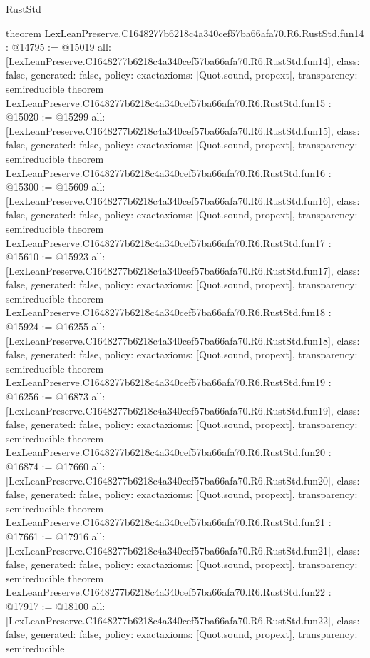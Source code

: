 \begin{lexlean}{RustStd}
\begin{coremodule}
{}
theorem LexLeanPreserve.C1648277b6218c4a340cef57ba66afa70.R6.RustStd.fun14 : @14795 := @15019 {
  all: [LexLeanPreserve.C1648277b6218c4a340cef57ba66afa70.R6.RustStd.fun14],
  class: false,
  generated: false,
  policy: exact{axioms: [Quot.sound, propext]},
  transparency: semireducible
}
theorem LexLeanPreserve.C1648277b6218c4a340cef57ba66afa70.R6.RustStd.fun15 : @15020 := @15299 {
  all: [LexLeanPreserve.C1648277b6218c4a340cef57ba66afa70.R6.RustStd.fun15],
  class: false,
  generated: false,
  policy: exact{axioms: [Quot.sound, propext]},
  transparency: semireducible
}
theorem LexLeanPreserve.C1648277b6218c4a340cef57ba66afa70.R6.RustStd.fun16 : @15300 := @15609 {
  all: [LexLeanPreserve.C1648277b6218c4a340cef57ba66afa70.R6.RustStd.fun16],
  class: false,
  generated: false,
  policy: exact{axioms: [Quot.sound, propext]},
  transparency: semireducible
}
theorem LexLeanPreserve.C1648277b6218c4a340cef57ba66afa70.R6.RustStd.fun17 : @15610 := @15923 {
  all: [LexLeanPreserve.C1648277b6218c4a340cef57ba66afa70.R6.RustStd.fun17],
  class: false,
  generated: false,
  policy: exact{axioms: [Quot.sound, propext]},
  transparency: semireducible
}
theorem LexLeanPreserve.C1648277b6218c4a340cef57ba66afa70.R6.RustStd.fun18 : @15924 := @16255 {
  all: [LexLeanPreserve.C1648277b6218c4a340cef57ba66afa70.R6.RustStd.fun18],
  class: false,
  generated: false,
  policy: exact{axioms: [Quot.sound, propext]},
  transparency: semireducible
}
theorem LexLeanPreserve.C1648277b6218c4a340cef57ba66afa70.R6.RustStd.fun19 : @16256 := @16873 {
  all: [LexLeanPreserve.C1648277b6218c4a340cef57ba66afa70.R6.RustStd.fun19],
  class: false,
  generated: false,
  policy: exact{axioms: [Quot.sound, propext]},
  transparency: semireducible
}
theorem LexLeanPreserve.C1648277b6218c4a340cef57ba66afa70.R6.RustStd.fun20 : @16874 := @17660 {
  all: [LexLeanPreserve.C1648277b6218c4a340cef57ba66afa70.R6.RustStd.fun20],
  class: false,
  generated: false,
  policy: exact{axioms: [Quot.sound, propext]},
  transparency: semireducible
}
theorem LexLeanPreserve.C1648277b6218c4a340cef57ba66afa70.R6.RustStd.fun21 : @17661 := @17916 {
  all: [LexLeanPreserve.C1648277b6218c4a340cef57ba66afa70.R6.RustStd.fun21],
  class: false,
  generated: false,
  policy: exact{axioms: [Quot.sound, propext]},
  transparency: semireducible
}
theorem LexLeanPreserve.C1648277b6218c4a340cef57ba66afa70.R6.RustStd.fun22 : @17917 := @18100 {
  all: [LexLeanPreserve.C1648277b6218c4a340cef57ba66afa70.R6.RustStd.fun22],
  class: false,
  generated: false,
  policy: exact{axioms: [Quot.sound, propext]},
  transparency: semireducible
}
\end{coremodule}
\end{lexlean}
